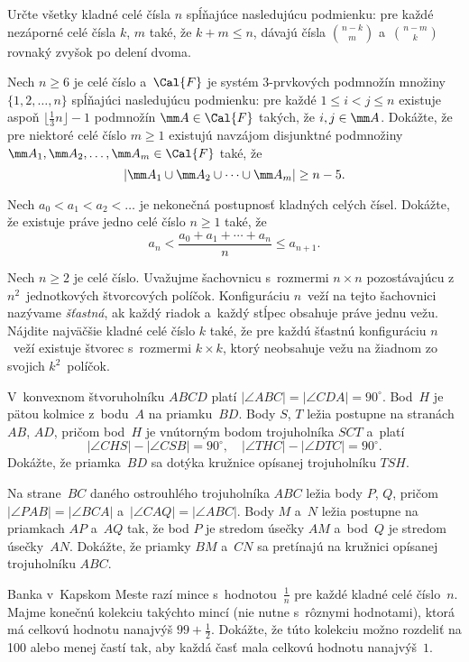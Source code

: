 {%
Určte všetky kladné celé čísla $n$ spĺňajúce nasledujúcu podmienku: pre každé nezáporné celé čísla $k$, $m$ také, že $k+m \le n$, dávajú čísla ${n-k} \choose {m}$ a~${n-m} \choose {k}$ rovnaký zvyšok po delení dvoma.
}

{%
Nech $n\ge6$ je celé číslo a~$\Cal{F}$ je systém $3$-prvkových podmnožín množiny $\{ 1, 2, \ldots, n\}$ spĺňajúci nasledujúcu podmienku: pre každé $1 \le i < j \le n$ existuje aspoň $\lfloor \frac13n\rfloor - 1$ podmnožín $\mm A \in \Cal{F}$ takých, že $i, j \in\mm A$. Dokážte, že pre niektoré celé číslo $m\ge1$ existujú navzájom disjunktné podmnožiny $\mm A_1, \mm A_2, \dots, \mm A_m \in \Cal{F}$ také, že
$$
|\mm A_1 \cup \mm A_2 \cup \dots \cup \mm A_m | \ge n-5.
$$
}

{%
Nech $a_0<a_1<a_2<\dots$ je nekonečná postupnosť kladných celých čísel.
Dokážte, že existuje práve jedno celé číslo $n\ge1$ také, že
$$
  a_n < \frac{a_0+a_1+\cdots+a_n}n \le a_{n+1}.
$$}

{%
Nech $n\ge2$ je celé číslo. Uvažujme šachovnicu s~rozmermi $n\times n$ pozostávajúcu z~$n^2$~jednotkových štvorcových políčok.
Konfiguráciu $n$~veží na tejto šachovnici nazývame {\it šťastná}, ak každý riadok a~každý stĺpec obsahuje práve jednu vežu. Nájdite najväčšie kladné celé číslo $k$ také, že pre každú šťastnú konfiguráciu $n$~veží existuje štvorec s~rozmermi $k \times k$, ktorý neobsahuje vežu na žiadnom zo svojich $k^2$~políčok.}

{%
V~konvexnom štvoruholníku $ABCD$ platí $|\angle ABC|=|\angle CDA|=90^\circ$.
Bod~$H$ je pätou kolmice z~bodu~$A$ na priamku~$BD$.
Body $S$, $T$ ležia postupne na stranách $AB$, $AD$,
pričom bod~$H$ je vnútorným bodom trojuholníka $SCT$ a~platí
$$
|\angle CHS|-|\angle CSB|=90^\circ,\quad |\angle THC|-|\angle DTC|=90^\circ.
$$
Dokážte, že priamka~$BD$ sa dotýka kružnice opísanej trojuholníku $TSH$.}

{%
Na strane~$BC$ daného ostrouhlého trojuholníka $ABC$
ležia body $P$, $Q$, pričom $|\angle PAB|=|\angle BCA|$ a~$|\angle CAQ|=|\angle ABC|$.  Body $M$ a~$N$ ležia postupne na priamkach $AP$ a~$AQ$ tak, že bod $P$ je stredom úsečky $AM$ a~bod~$Q$ je stredom úsečky~$AN$. Dokážte, že priamky $BM$ a~$CN$ sa pretínajú na kružnici opísanej trojuholníku $ABC$.}

{%
Banka v~Kapskom Meste razí mince s~hodnotou~$\frac1n$ pre každé kladné celé číslo~$n$. Majme konečnú kolekciu takýchto mincí (nie nutne s~rôznymi hodnotami), ktorá má celkovú hodnotu nanajvýš $99+\frac12$. Dokážte, že túto kolekciu možno rozdeliť na 100 alebo menej častí tak, aby každá časť mala celkovú hodnotu nanajvýš~$1$.}

